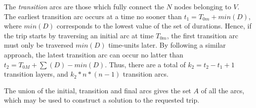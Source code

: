 The \textit{transition} arcs are those which fully connect the $N$ nodes
belonging to $V$. The earliest transition arc occurs at a time no sooner than
$t_1 = T_{0m} + min(D)$, where $min(D)$ corresponds to the lowest value of the
set of durations. Hence, if the trip starts by traversing an initial arc
at time $T_{0m}$, the first transition arc must only be traversed $min(D)$
time-units later. By following a similar approach, the latest transition arc can
occur no latter than $t_2 = T_{0M} + \sum(D) - min(D)$. Thus, there are a total
of $k_2 = t_2-t_1+1$ transition layers, and $k_2*n*(n-1)$ transition arcs.

The union of the initial, transition and final arcs gives the set $A$ of all the
arcs, which may be used to construct a solution to the requested trip. 


